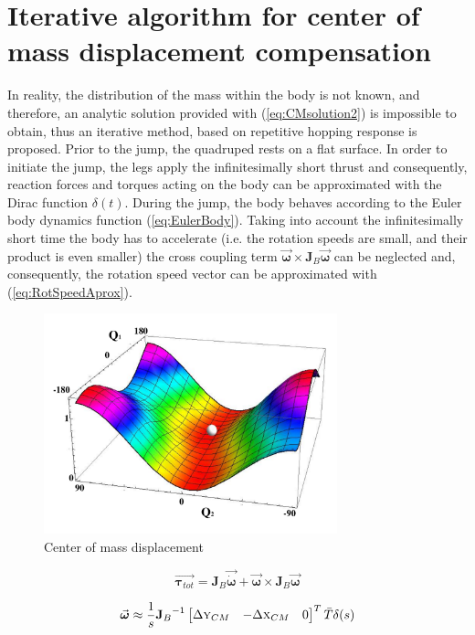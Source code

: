 \section{Iterative algorithm for center of mass displacement compensation}\label{sec:Algorithm}
In reality, the distribution of the mass within the body is not known, and therefore, an analytic solution provided with (\ref{eq:CMsolution2}) is impossible to obtain, thus an iterative method, based on repetitive hopping response is proposed. Prior to the jump, the quadruped rests on a flat surface. In order to initiate the jump, the legs apply the infinitesimally short thrust and consequently, reaction forces and torques acting on the body can be approximated with the Dirac function $\delta (t)$. During the jump, the body behaves according to the Euler body dynamics function (\ref{eq:EulerBody}). Taking into account the infinitesimally short time the body has to accelerate (i.e. the rotation speeds are small, and their product is even smaller) the cross coupling term $\vec{\boldsymbol{\omega}}\times \textbf{J}_B\vec{\boldsymbol{\omega}}$ can be neglected and, consequently, the rotation speed vector can be approximated with (\ref{eq:RotSpeedAprox}).
\begin{figure}[!t]
	\centering
	\includegraphics[width=85mm]{./pictures/RobinRepicCM.pdf}
	\caption{Center of mass displacement}
	\label{fig:CM3Dfunction}
\end{figure}

\begin{equation}\label{eq:EulerBody}
\vec{\boldsymbol{\tau}_{tot}}=\textbf{J}_B\vec{\dot{\boldsymbol{\omega}}}+\vec{\boldsymbol{\omega}}\times \textbf{J}_B\vec{\boldsymbol{\omega}}
\end{equation}

\begin{equation}\label{eq:RotSpeedAprox}
\vec{\boldsymbol{\omega}}\approx \frac{1}{s}{\textbf{J}_B}^{-1}\begin{bmatrix}
\Delta \textsc{y}_{CM} & -\Delta \textsc{x}_{CM} & 0
\end{bmatrix}^T\bar{T}\delta(s)
\end{equation}

